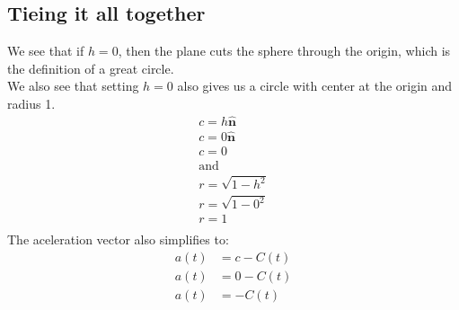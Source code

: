 \documentclass[9pt]{extarticle}
\begin{document}
\subsection{Tieing it all together}
We see that if $h = 0$, then the plane cuts the sphere through the origin, which is the definition of a great circle.\\
We also see that setting $h = 0$ also gives us a circle with center at the origin and radius 1.
\begin{align*}
    c = h \hat{\textbf{n}} \\
    c = 0 \hat{\textbf{n}} \\
    c = 0                  \\
    \text{and}             \\
    r = \sqrt{1- h^2}      \\
    r = \sqrt{1- 0^2}      \\
    r = 1                  \\
\end{align*}
The aceleration vector also simplifies to:
\begin{align*}
    a(t) & = c - C(t) \\
    a(t) & = 0 - C(t) \\
    a(t) & = - C(t)
\end{align*}
\end{document}
